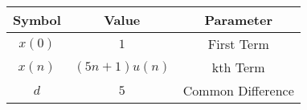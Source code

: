 
\begin{tabular}{|c|c|c|}
\hline
\textbf{Symbol} & \textbf{Value} & \textbf{Parameter} \\
\hline
\(x(0)\) & \(1 \) & First Term \\
\hline
\(x(n)\) & \((5n+1)u(n)\) & kth Term \\
\hline
\(d\) & \(5 \) & Common Difference \\
\hline
\end{tabular}

